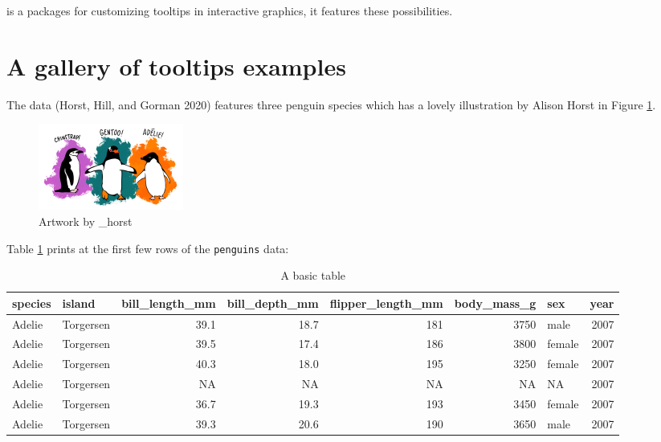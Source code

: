  is a packages for customizing tooltips in interactive graphics, it features these possibilities.

\hypertarget{a-gallery-of-tooltips-examples}{%
\section{A gallery of tooltips examples}\label{a-gallery-of-tooltips-examples}}

The  data (Horst, Hill, and Gorman 2020) features three penguin species which has a lovely illustration by Alison Horst in Figure \ref{fig:penguins-alison}.

\begin{figure}
\includegraphics[width=1\linewidth,height=0.3\textheight]{penguins} \caption{Artwork by \@allison\_horst}\label{fig:penguins-alison}
\end{figure}

Table \ref{tab:penguins-tab-static} prints at the first few rows of the \texttt{penguins} data:

\begin{table}

\caption{\label{tab:penguins-tab-static}A basic table}
\centering
\fontsize{7}{9}\selectfont
\begin{tabular}[t]{l|l|r|r|r|r|l|r}
\hline
species & island & bill\_length\_mm & bill\_depth\_mm & flipper\_length\_mm & body\_mass\_g & sex & year\\
\hline
Adelie & Torgersen & 39.1 & 18.7 & 181 & 3750 & male & 2007\\
\hline
Adelie & Torgersen & 39.5 & 17.4 & 186 & 3800 & female & 2007\\
\hline
Adelie & Torgersen & 40.3 & 18.0 & 195 & 3250 & female & 2007\\
\hline
Adelie & Torgersen & NA & NA & NA & NA & NA & 2007\\
\hline
Adelie & Torgersen & 36.7 & 19.3 & 193 & 3450 & female & 2007\\
\hline
Adelie & Torgersen & 39.3 & 20.6 & 190 & 3650 & male & 2007\\
\hline
\end{tabular}
\end{table}

